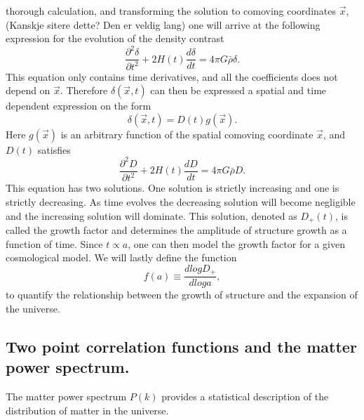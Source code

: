 thorough calculation, and transforming the solution to comoving coordinates $\vec{x}$, (Kanskje sitere dette? Den er veldig lang) one will arrive at the following expression for the
evolution of the density contrast
\begin{equation}
    \frac{\partial^2 \delta}{\partial t^2} + 2H(t) \frac{d \delta}{dt}=4\pi G\bar{\rho}\delta.
\end{equation}
This equation only contains time derivatives, and all the coefficients does not
depend on $\vec{x}$. Therefore $\delta(\vec{x}, t)$ can then be expressed a spatial and time
dependent expression on the form 
\begin{equation}
    \delta(\vec{x}, t) = D(t)g(\vec{x}).
\end{equation}
Here $g(\vec{x})$ is an arbitrary function of the spatial comoving coordinate
$\vec{x}$, and $D(t)$ satisfies
\begin{equation}
    \frac{\partial^2 D}{\partial t^2} + 2H(t) \frac{d D}{dt}=4\pi G\bar{\rho}D.
\end{equation}
This equation has two solutions. One solution is strictly increasing and one is
strictly decreasing. As time evolves the decreasing solution will become negligible
and the increasing solution will dominate. This solution, denoted as $D_+(t)$,
is called the growth factor and determines the amplitude of structure growth as
a function of time. Since $t\propto a$, one can then model the growth factor for
a given cosmological model. We will lastly define the function
\begin{equation}
    f(a) \equiv \frac{d log D_+}{d log a},
\end{equation}
to quantify the relationship between the growth of structure and the expansion
of the universe.

\subsection{Two point correlation functions and the matter power spectrum.}

The matter power spectrum $P(k)$ provides a statistical description of the
distribution of matter in the universe.
